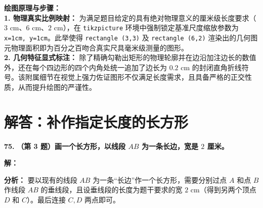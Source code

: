 \vspace{0.4cm}
{\small\color{blue!70!black}
\textbf{绘图原理与步骤：}\\
\textbf{1. 物理真实比例映射：} 为满足题目给定的具有绝对物理意义的厘米级长度要求（$3\text{ cm}$、$6\text{ cm}$、$2\text{ cm}$），在 \texttt{tikzpicture} 环境中强制锁定基准尺度缩放参数为 \texttt{x=1cm, y=1cm}。此举使得 \texttt{rectangle (3,3)} 及 \texttt{rectangle (6,2)} 渲染出的几何图元物理面积即为百分之百吻合真实尺具毫米级测量的图形。\\
\textbf{2. 几何特征显式标注：} 除了精确勾勒出矩形的物理轮廓并在边沿加注边长的数值外，还在每个四边形的四个内角处统一追加了边长为 $0.2\text{ cm}$ 的封闭直角折线符号。该附属细节在视觉上强力佐证图形不仅满足长度需求，且具备严格的正交性质，从而提升绘图的严谨性。
}

\newpage



\newpage

\section{解答：补作指定长度的长方形}

\vspace{0.6cm}

\textbf{\LARGE 75.} \textbf{（第 3 题）画一个长方形，以线段 $AB$ 为一条长边，宽是 $2$ 厘米。}

\vspace{0.4cm}
\textbf{解：}

\textbf{分析：} 要以现有的线段 $AB$ 为一条“长边”作一个长方形，需要分别过点 $A$ 和点 $B$ 作线段 $AB$ 的垂线段，且设垂线段的长度为题干要求的宽 $2\text{ cm}$（得到另两个顶点 $D$ 和 $C$）。最后连接 $C, D$ 两点即可。

